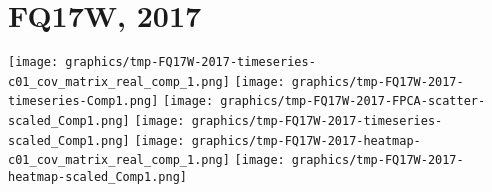 
\section{FQ17W, 2017}
\setcounter{theorem}{0}

\renewcommand{\theenumi}{\roman{enumi}}
\renewcommand{\labelenumi}{\textnormal{(\theenumi)}$\;\;$}


\begin{center}
\begin{minipage}{7.0in}
\texttt{[image: graphics/tmp-FQ17W-2017-timeseries-c01\_cov\_matrix\_real\_comp\_1.png]}
\quad
\texttt{[image: graphics/tmp-FQ17W-2017-timeseries-Comp1.png]}
\vskip 0.5cm
\texttt{[image: graphics/tmp-FQ17W-2017-FPCA-scatter-scaled\_Comp1.png]}
\quad
\texttt{[image: graphics/tmp-FQ17W-2017-timeseries-scaled\_Comp1.png]}
\vskip 0.5cm
\texttt{[image: graphics/tmp-FQ17W-2017-heatmap-c01\_cov\_matrix\_real\_comp\_1.png]}
\quad
\texttt{[image: graphics/tmp-FQ17W-2017-heatmap-scaled\_Comp1.png]}
\end{minipage}
\end{center}

          
\renewcommand{\theenumi}{\roman{enumi}}
\renewcommand{\labelenumi}{\textnormal{(\theenumi)}$\;\;$}

